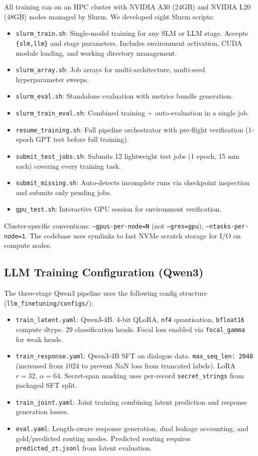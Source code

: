 \documentclass[11pt]{article}
\begin{document}
All training ran on an HPC cluster with NVIDIA A30 (24GB) and NVIDIA L20 (48GB) nodes managed by Slurm.
We developed eight Slurm scripts:

\begin{itemize}
    \item \texttt{slurm\_train.sh}: Single-model training for any SLM or LLM stage. Accepts \texttt{\{slm,llm\}} and stage parameters. Includes environment activation, CUDA module loading, and working directory management.
    \item \texttt{slurm\_array.sh}: Job arrays for multi-architecture, multi-seed hyperparameter sweeps.
    \item \texttt{slurm\_eval.sh}: Standalone evaluation with metrics bundle generation.
    \item \texttt{slurm\_train\_eval.sh}: Combined training $+$ auto-evaluation in a single job.
    \item \texttt{resume\_training.sh}: Full pipeline orchestrator with pre-flight verification (1-epoch GPT test before full training).
    \item \texttt{submit\_test\_jobs.sh}: Submits 12 lightweight test jobs (1 epoch, 15 min each) covering every training task.
    \item \texttt{submit\_missing.sh}: Auto-detects incomplete runs via checkpoint inspection and submits only pending jobs.
    \item \texttt{gpu\_test.sh}: Interactive GPU session for environment verification.
\end{itemize}

Cluster-specific conventions: \texttt{--gpus-per-node=N} (not \texttt{--gres=gpu}), \texttt{--ntasks-per-node=1}.
The codebase uses symlinks to fast NVMe scratch storage for I/O on compute nodes.

\subsection{LLM Training Configuration (Qwen3)}

The three-stage Qwen3 pipeline uses the following config structure (\texttt{llm\_finetuning/configs/}):

\begin{itemize}
    \item \texttt{train\_latent.yaml}: Qwen3-4B. 4-bit QLoRA, \texttt{nf4} quantisation, \texttt{bfloat16} compute dtype. 29 classification heads. Focal loss enabled via \texttt{focal\_gamma} for weak heads.
    \item \texttt{train\_response.yaml}: Qwen3-4B SFT on dialogue data. \texttt{max\_seq\_len: 2048} (increased from 1024 to prevent NaN loss from truncated labels). LoRA $r=32$, $\alpha=64$. Secret-span masking uses per-record \texttt{secret\_strings} from packaged SFT split.
    \item \texttt{train\_joint.yaml}: Joint training combining latent prediction and response generation losses.
    \item \texttt{eval.yaml}: Length-aware response generation, dual leakage accounting, and gold/predicted routing modes. Predicted routing requires \texttt{predicted\_zt.jsonl} from latent evaluation.
\end{itemize}
\end{document}
